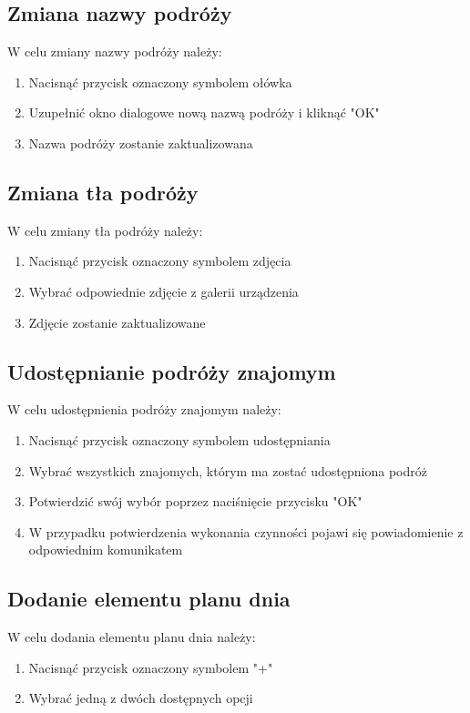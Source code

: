\documentclass[10pt,twoside,a4paper]{report}
\begin{document}
\subsection{Zmiana nazwy podróży}

W celu zmiany nazwy podróży należy:
\begin{enumerate}
\item Nacisnąć przycisk oznaczony symbolem ołówka
\item Uzupełnić okno dialogowe nową nazwą podróży i kliknąć "OK"
\item Nazwa podróży zostanie zaktualizowana
\end{enumerate}

\subsection{Zmiana tła podróży}

W celu zmiany tła podróży należy:
\begin{enumerate}
\item Nacisnąć przycisk oznaczony symbolem zdjęcia
\item Wybrać odpowiednie zdjęcie z galerii urządzenia
\item Zdjęcie zostanie zaktualizowane
\end{enumerate}

\subsection{Udostępnianie podróży znajomym}

W celu udostępnienia podróży znajomym należy:
\begin{enumerate}
\item Nacisnąć przycisk oznaczony symbolem udostępniania
\item Wybrać wszystkich znajomych, którym ma zostać udostępniona podróż
\item Potwierdzić swój wybór poprzez naciśnięcie przycisku "OK"
\item W przypadku potwierdzenia wykonania czynności pojawi się powiadomienie z odpowiednim komunikatem
\end{enumerate}

\subsection{Dodanie elementu planu dnia}
W celu dodania elementu planu dnia należy:
\begin{enumerate}
\item Nacisnąć przycisk oznaczony symbolem "+"
\item Wybrać jedną z dwóch dostępnych opcji
\end{enumerate} 
\end{document}
